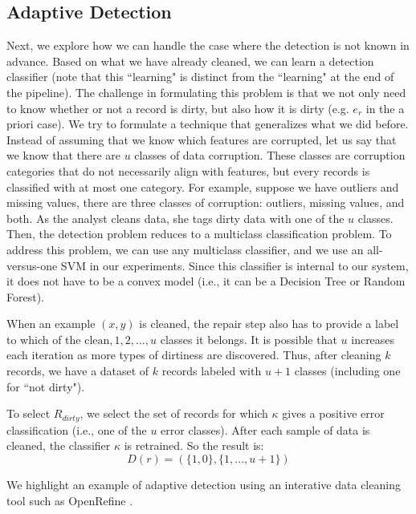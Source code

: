 \subsection{Adaptive Detection}
Next, we explore how we can handle the case where the detection is not known in advance.
Based on what we have already cleaned, we can learn a detection classifier (note that this ``learning" is distinct from the ``learning" at the end of the pipeline).
The challenge in formulating this problem is that we not only need to know whether or not a record is dirty, but also how it is dirty (e.g. $e_r$ in the a priori case).
We try to formulate a technique that generalizes what we did before.
Instead of assuming that we know which features are corrupted, let us say that we know that there are $u$ classes of data corruption.
These classes are corruption categories that do not necessarily align with features, but every records is classified with at most one category.
For example, suppose we have outliers and missing values, there are three classes of corruption: outliers, missing values, and both.
As the analyst cleans data, she tags dirty data with one of the $u$ classes.
Then, the detection problem reduces to a multiclass classification problem.
To address this problem, we can use any multiclass classifier, and we use an all-versus-one SVM in our experiments.
Since this classifier is internal to our system, it does not have to be a convex model (i.e., it can be a Decision Tree or Random Forest).

When an example $(x,y)$ is cleaned, the repair step also has to provide a label to which of the ${\text{clean}, 1,2,...,u}$ classes it belongs. It is possible that $u$ increases each iteration as more types of dirtiness are discovered. 
Thus, after cleaning $k$ records, we have a dataset of $k$ records labeled with $u+1$ classes (including one for ``not dirty").

\begin{definition}
To select $R_{dirty}$, we select the set of records for which $\kappa$ gives a positive error classification (i.e., one of the $u$ error classes).
After each sample of data is cleaned, the classifier $\kappa$ is retrained.
So the result is:
\[D(r) = (\{1,0\},\{1,...,u+1\})\]
\end{definition}

We highlight an example of adaptive detection using an interative data cleaning tool such as OpenRefine \cite{openrefine}.

